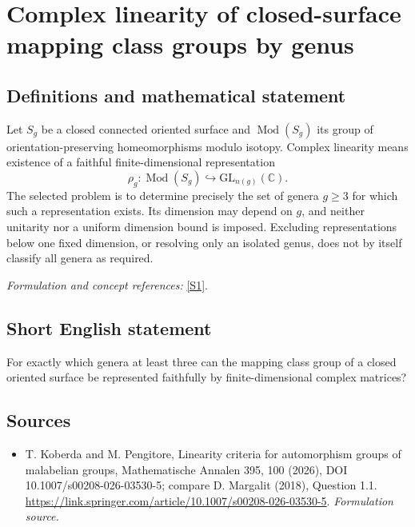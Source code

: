 \documentclass[11pt]{article}
\begin{document}
\section*{\texorpdfstring{Complex linearity of closed-surface mapping class groups by genus}{Complex linearity of closed-surface mapping class groups by genus}}\label{281}
\subsection{Definitions and mathematical statement}
Let $S_g$ be a closed connected oriented surface and
$\operatorname{Mod}(S_g)$ its group of orientation-preserving homeomorphisms modulo isotopy. Complex linearity means existence of a faithful finite-dimensional representation
\[
 \rho_g:\operatorname{Mod}(S_g)\hookrightarrow\mathrm{GL}_{n(g)}({\mathbb{C}}).
\]
The selected problem is to determine precisely the set of genera $g\ge3$ for which such a representation exists. Its dimension may depend on $g$, and neither unitarity nor a uniform dimension bound is imposed. Excluding representations below one fixed dimension, or resolving only an isolated genus, does not by itself classify all genera as required.
\par\smallskip\textit{Formulation and concept references:} \href{https://link.springer.com/article/10.1007/s00208-026-03530-5}{[S1]}.

\subsection{Short English statement}
For exactly which genera at least three can the mapping class group of a closed oriented surface be represented faithfully by finite-dimensional complex matrices?
\subsection{Sources}
\begin{itemize}
\item[S1]T. Koberda and M. Pengitore, Linearity criteria for automorphism groups of malabelian groups, Mathematische Annalen 395, 100 (2026), DOI 10.1007/s00208-026-03530-5; compare D. Margalit (2018), Question 1.1.
\url{https://link.springer.com/article/10.1007/s00208-026-03530-5}.
\textit{Formulation source.}
\end{itemize}
\end{document}
